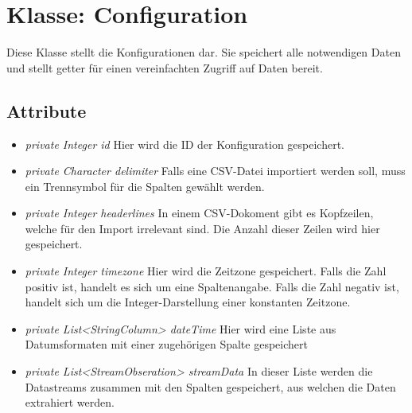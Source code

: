
\section{Klasse: Configuration}
Diese Klasse stellt die Konfigurationen dar. Sie speichert
alle notwendigen Daten und stellt getter für einen vereinfachten Zugriff auf Daten bereit.

\subsection{Attribute}

\begin{itemize}
	\item \textit{private Integer id} Hier wird die ID der Konfiguration gespeichert.
	
	\item \textit{private Character delimiter} Falls eine CSV-Datei importiert werden soll, muss ein Trennsymbol für die Spalten gewählt werden.
	
	\item \textit{private Integer headerlines} In einem CSV-Dokoment gibt es Kopfzeilen, welche für den Import irrelevant sind. Die Anzahl dieser Zeilen wird hier gespeichert.
	
	\item \textit{private Integer timezone} Hier wird die Zeitzone gespeichert. Falls die Zahl positiv ist, handelt es sich um eine Spaltenangabe. Falls die Zahl negativ ist, handelt sich um die Integer-Darstellung einer konstanten Zeitzone.
	
	\item \textit{private List<StringColumn> dateTime} Hier wird eine Liste aus Datumsformaten mit einer zugehörigen Spalte gespeichert 
	
	\item \textit{private List<StreamObseration> streamData} In dieser Liste werden die Datastreams zusammen mit den Spalten gespeichert, aus welchen die Daten extrahiert werden.
\end{itemize}

